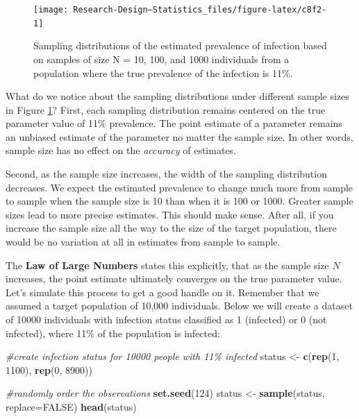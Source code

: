 \documentclass[
]{book}
\newenvironment{Shaded}{\begin{snugshade}}{\end{snugshade}}
\newcommand{\AttributeTok}[1]{\textcolor[rgb]{0.13,0.29,0.53}{#1}}
\newcommand{\CommentTok}[1]{\textcolor[rgb]{0.56,0.35,0.01}{\textit{#1}}}
\newcommand{\ConstantTok}[1]{\textcolor[rgb]{0.56,0.35,0.01}{#1}}
\newcommand{\DecValTok}[1]{\textcolor[rgb]{0.00,0.00,0.81}{#1}}
\newcommand{\FunctionTok}[1]{\textcolor[rgb]{0.13,0.29,0.53}{\textbf{#1}}}
\newcommand{\NormalTok}[1]{#1}
\newcommand{\OtherTok}[1]{\textcolor[rgb]{0.56,0.35,0.01}{#1}}
\begin{document}
\begin{figure}

{\centering \texttt{[image: Research-Design---Statistics\_files/figure-latex/c8f2-1]} 

}

\caption{Sampling distributions of the estimated prevalence of infection based on samples of size N = 10, 100, and 1000 individuals from a population where the true prevalence of the infection is 11\%.}\label{fig:c8f2}
\end{figure}

What do we notice about the sampling distributions under different sample sizes in Figure \ref{fig:c8f2}? First, each sampling distribution remains centered on the true parameter value of 11\% prevalence. The point estimate of a parameter remains an unbiased estimate of the parameter no matter the sample size. In other words, sample size has no effect on the \emph{accuracy} of estimates.

Second, as the sample size increases, the width of the sampling distribution decreases. We expect the estimated prevalence to change much more from sample to sample when the sample size is 10 than when it is 100 or 1000. Greater sample sizes lead to more precise estimates. This should make sense. After all, if you increase the sample size all the way to the size of the target population, there would be no variation at all in estimates from sample to sample.

The \textbf{Law of Large Numbers} states this explicitly, that as the sample size \(N\) increases, the point estimate ultimately converges on the true parameter value. Let's simulate this process to get a good handle on it. Remember that we assumed a target population of 10,000 individuals. Below we will create a dataset of 10000 individuals with infection status classified as 1 (infected) or 0 (not infected), where 11\% of the population is infected:

\begin{Shaded}
\begin{Highlighting}[]
\CommentTok{\#create infection status for 10000 people with 11\% infected }
\NormalTok{status }\OtherTok{\textless{}{-}} \FunctionTok{c}\NormalTok{(}\FunctionTok{rep}\NormalTok{(}\DecValTok{1}\NormalTok{, }\DecValTok{1100}\NormalTok{), }\FunctionTok{rep}\NormalTok{(}\DecValTok{0}\NormalTok{, }\DecValTok{8900}\NormalTok{))}

\CommentTok{\#randomly order the observations }
\FunctionTok{set.seed}\NormalTok{(}\DecValTok{124}\NormalTok{)}
\NormalTok{status }\OtherTok{\textless{}{-}} \FunctionTok{sample}\NormalTok{(status, }\AttributeTok{replace=}\ConstantTok{FALSE}\NormalTok{) }
\FunctionTok{head}\NormalTok{(status)}
\end{Highlighting}
\end{Shaded}
\end{document}
